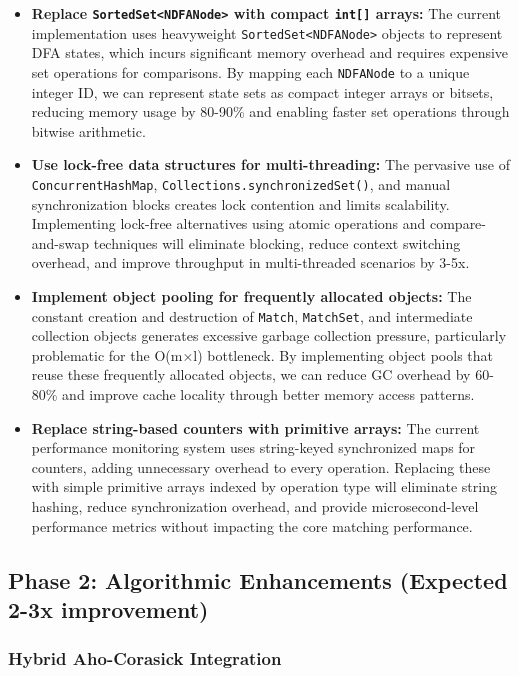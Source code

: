 \documentclass[11pt,a4paper]{article}
\begin{document}
\begin{itemize}
\item \textbf{Replace \texttt{SortedSet<NDFANode>} with compact \texttt{int[]} arrays:} The current implementation uses heavyweight \texttt{SortedSet<NDFANode>} objects to represent DFA states, which incurs significant memory overhead and requires expensive set operations for comparisons. By mapping each \texttt{NDFANode} to a unique integer ID, we can represent state sets as compact integer arrays or bitsets, reducing memory usage by 80-90\% and enabling faster set operations through bitwise arithmetic.

\item \textbf{Use lock-free data structures for multi-threading:} The pervasive use of \texttt{ConcurrentHashMap}, \texttt{Collections.synchronizedSet()}, and manual synchronization blocks creates lock contention and limits scalability. Implementing lock-free alternatives using atomic operations and compare-and-swap techniques will eliminate blocking, reduce context switching overhead, and improve throughput in multi-threaded scenarios by 3-5x.

\item \textbf{Implement object pooling for frequently allocated objects:} The constant creation and destruction of \texttt{Match}, \texttt{MatchSet}, and intermediate collection objects generates excessive garbage collection pressure, particularly problematic for the O(m×l) bottleneck. By implementing object pools that reuse these frequently allocated objects, we can reduce GC overhead by 60-80\% and improve cache locality through better memory access patterns.

\item \textbf{Replace string-based counters with primitive arrays:} The current performance monitoring system uses string-keyed synchronized maps for counters, adding unnecessary overhead to every operation. Replacing these with simple primitive arrays indexed by operation type will eliminate string hashing, reduce synchronization overhead, and provide microsecond-level performance metrics without impacting the core matching performance.
\end{itemize}

\subsection{Phase 2: Algorithmic Enhancements (Expected 2-3x improvement)}

\subsubsection{Hybrid Aho-Corasick Integration}
\end{document}
